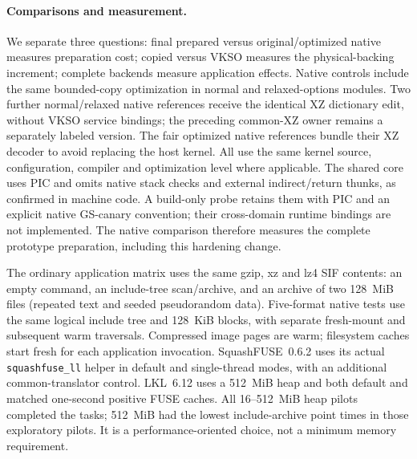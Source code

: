 \paragraph{Comparisons and measurement.}
We separate three questions: final prepared versus original/optimized native
measures preparation cost; copied versus VKSO measures the physical-backing
increment; complete backends measure application effects. Native controls
include the same bounded-copy optimization in normal and relaxed-options
modules. Two further normal/relaxed native references receive the identical
XZ dictionary edit, without VKSO service bindings; the preceding common-XZ
owner remains a separately labeled version. The fair optimized native
references bundle their XZ decoder to avoid replacing the host kernel.
All use the same kernel
source, configuration, compiler and optimization level where applicable.
The shared core uses PIC and omits native stack checks and external
indirect/return thunks, as confirmed in machine code. A build-only probe
retains them with PIC and an explicit native GS-canary convention; their
cross-domain runtime bindings are not implemented. The native comparison
therefore measures the complete prototype preparation, including this
hardening change.

The ordinary application matrix uses the same gzip, xz and lz4 SIF contents:
an empty command, an include-tree scan/archive, and an archive of two
128~MiB files (repeated text and seeded pseudorandom data). Five-format native
tests use the same logical include tree and 128~KiB blocks, with separate
fresh-mount and subsequent warm traversals. Compressed image pages are warm;
filesystem caches start fresh for each application invocation.
SquashFUSE~0.6.2 uses its actual \texttt{squashfuse\_ll} helper in default and
single-thread modes, with an additional common-translator control.
LKL~6.12 uses a 512~MiB heap and both default and matched one-second positive
FUSE caches. All 16--512~MiB heap pilots completed the tasks; 512~MiB had the
lowest include-archive point times in those exploratory pilots. It is a
performance-oriented choice, not a minimum memory requirement.

